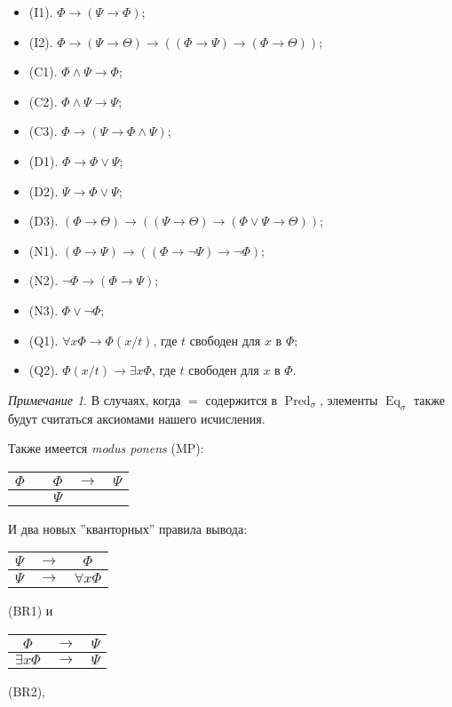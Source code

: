 \documentclass[a4paper,100pt]{article}
\theoremstyle{indented}
\theoremstyle{definition}
\theoremstyle{remark}
\newtheorem{remark}{Примечание}
\DeclareMathOperator{\Pred}{Pred}
\DeclareMathOperator{\Eq}{Eq}
\begin{document}
\begin{itemize}
  \item (I1). $\Phi\rightarrow (\Psi\rightarrow \Phi)$;
  \item (I2). $\Phi\rightarrow (\Psi\rightarrow \Theta)\rightarrow((\Phi\rightarrow \Psi)\rightarrow (\Phi\rightarrow \Theta))$; 
  \item (C1). $\Phi \wedge \Psi \rightarrow \Phi$; 
  \item (C2). $\Phi \wedge \Psi \rightarrow \Psi$; 
  \item (C3). $\Phi\rightarrow (\Psi \rightarrow \Phi \wedge \Psi)$;
  \item (D1). $\Phi\rightarrow \Phi \vee\Psi$;
  \item (D2). $\Psi\rightarrow \Phi \vee \Psi$; 
  \item (D3). $(\Phi\rightarrow \Theta)\rightarrow((\Psi\rightarrow \Theta)\rightarrow (\Phi\vee\Psi\rightarrow\Theta))$;
  \item (N1). $(\Phi\rightarrow \Psi)\rightarrow((\Phi\rightarrow \neg \Psi)\rightarrow \neg \Phi)$; 
  \item (N2). $\neg\Phi \rightarrow (\Phi\rightarrow \Psi)$; 
  \item (N3). $\Phi \vee \neg \Phi$;
  \item (Q1). $\forall x \Phi \rightarrow \Phi(x/t)$, где $t$ свободен для $x$ в $\Phi$;
  \item (Q2). $\Phi(x/t)\rightarrow \exists x \Phi$, где $t$ свободен для $x$ в $\Phi$. 
\end{itemize}

\begin{remark}
  В случаях, когда $=$ содержится в $\Pred_\sigma$, элементы $\Eq_\sigma$ также будут считаться аксиомами нашего исчисления.
\end{remark}

Также имеется \textit{modus ponens} (MP):

\begin{center}
  \begin{tabular}{c c c c c}
    $\Phi$ & & $\Phi$ & $\rightarrow$ & $\Psi$ \\ 
    \hline
    & & $\Psi$ & & 
  \end{tabular}
\end{center}

И два новых ''кванторных'' правила вывода:

\begin{center}
  \begin{tabular}{c c c}
    $\Psi$ & $\rightarrow$ & $\Phi$ \\ 
    \hline
    $\Psi$ & $\rightarrow$ & $\forall x \Phi$
  \end{tabular}
  (BR1)\: \:\: \: и \: \: \: \:
  \begin{tabular}{c c c}
    $\Phi$ & $\rightarrow$ & $\Psi$ \\ 
    \hline
    $\exists x \Phi$ & $\rightarrow$ & $\Psi$ 
  \end{tabular}
  (BR2), 
\end{center}
\end{document}
